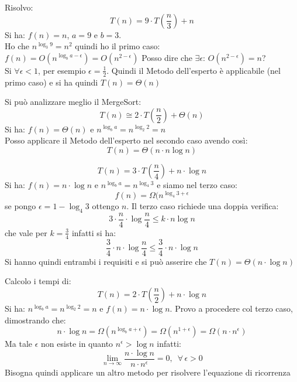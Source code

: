 \documentclass[a4paper,12pt,oneside,tikz]{book}
\begin{document}
\begin{esempio}
Risolvo:
$$T(n)=9\cdot T\left(\frac{n}{3}\right)+n$$
Si ha: $f(n)=n$, $a=9$ e $b=3$.\\
Ho che $n^{\log_3 9}=n^2$ quindi ho il primo caso:\\
$f(n)=O(n^{\log_b a -\epsilon})=O(n^{2-\epsilon})$
Posso dire che $\exists \epsilon:\, O(n^{2-\epsilon})=n$?\\
Si $\forall \epsilon<1$, per esempio $\epsilon=\frac{1}{2}$. Quindi il Metodo dell'esperto è applicabile (nel primo caso) e si ha quindi $T(n)=\Theta(n)$
\end{esempio}
\newpage
\begin{esempio}
Si può analizzare meglio il MergeSort:
$$T(n)\cong 2\cdot T\left(\frac{n}{2}\right)+\Theta(n)$$
Si ha: $f(n)=\Theta(n)$ e $n^{\log_b a}=n^{\log_2 2 }=n$\\
Posso applicare il Metodo dell'esperto nel secondo caso avendo così: $$T(n)=\Theta(n\cdot n\log n)$$
\end{esempio}
\begin{esempio}
$$T(n)=3\cdot T\left(\frac{n}{4}\right)+n\cdot \log n$$
Si ha: $f(n)=n\cdot \log n$ e $n^{\log_b a}=n^{\log_4 3}$ e siamo nel terzo caso:
$$f(n)=\Omega(n^{\log_4 3+\epsilon}$$
se pongo $\epsilon=1-\log_4 3$ ottengo $n$.
Il terzo caso richiede una doppia verifica:
$$3\cdot \frac{n}{4}\cdot\log \frac{n}{4}\leq k\cdot n\log n$$
che vale per $k=\frac{3}{4}$ infatti si ha:
$$\frac{3}{4}\cdot n\cdot\log \frac{n}{4}\leq \frac{3}{4} \cdot n\cdot \log n$$
Si hanno quindi entrambi i requisiti e si può asserire che $T(n)=\Theta(n\cdot\log n)$
\end{esempio}
\begin{esempio}
Calcolo i tempi di:
$$T(n)=2\cdot T\left(\frac{n}{2}\right)+n\cdot\log n$$
Si ha: $n^{\log_b a }=n^{\log_2 2 }=n$ e $f(n)=n\cdot\log n$.
Provo a procedere col terzo caso, dimostrando che: $$n\cdot\log n=\Omega(n^{\log_b a +\epsilon})=\Omega(n^{1+\epsilon})=\Omega(n\cdot n^\epsilon)$$
Ma tale $\epsilon$ non esiste in quanto $n^\epsilon>\log n$ infatti:
$$\lim_{n\rightarrow \infty}\frac{n\cdot\log n}{n\cdot n^\epsilon}=0,\,\,\, \forall\, \epsilon>0$$
Bisogna quindi applicare un altro metodo per risolvere l'equazione di ricorrenza
\end{esempio}
\newpage
\end{document}
